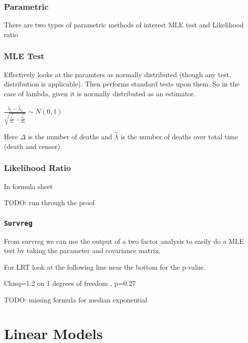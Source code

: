 \documentclass[
  letterpaper,
  DIV=11,
  numbers=noendperiod]{scrreprt}
\begin{document}
\hypertarget{parametric}{%
\subsection{Parametric}\label{parametric}}

There are two types of parametric methods of interest MLE test and
Likelihood ratio

\hypertarget{mle-test}{%
\subsection{MLE Test}\label{mle-test}}

Effectively looks at the paramters as normally distributed (though any
test, distribution is applicable). Then performs standard tests upon
them. So in the case of lambda, given it is normally distributed as an
estimator.

\(\frac{\hat{\lambda}_1 - \hat{\lambda}_2}{\sqrt{\frac{\hat{\lambda}_1^2}{\Delta_1}-\frac{\hat{\lambda}_2^2}{\Delta_2}}} \sim N(0,1)\)

Here \(\Delta\) is the number of deaths and \(\hat{\lambda}\) is the
number of deaths over total time (death and censor).

\hypertarget{likelihood-ratio}{%
\subsection{Likelihood Ratio}\label{likelihood-ratio}}

In formula sheet

TODO: run through the proof

\hypertarget{survreg}{%
\subsection{\texorpdfstring{\texttt{Survreg}}{Survreg}}\label{survreg}}

From survreg we can use the output of a two factor analysis to easily do
a MLE test by taking the parameter and covariance matrix.

For LRT look at the following line near the bottom for the p-value.

Chisq=1.2 on 1 degrees of freedom , p=0.27

TODO: missing formula for median exponential


\hypertarget{linear-models}{%
\chapter{Linear Models}\label{linear-models}}
\end{document}
